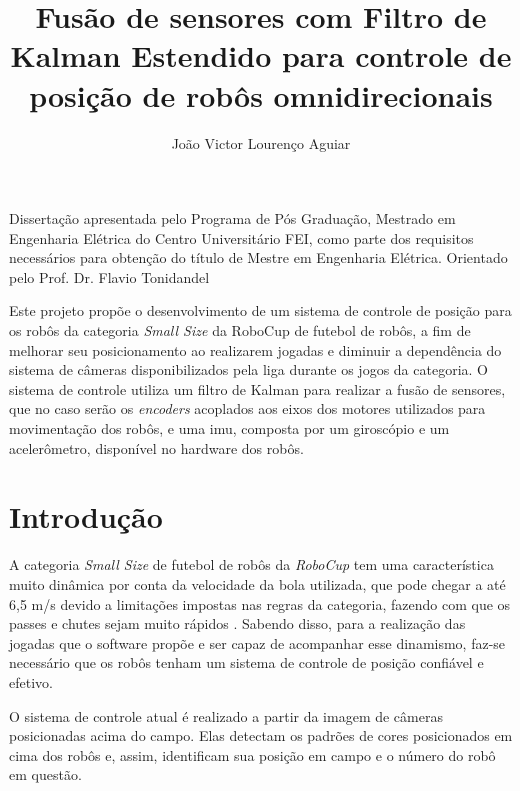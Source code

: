 \documentclass[acronym, symbols]{fei}
\title{Fusão de sensores com Filtro de Kalman Estendido para controle de posição de robôs omnidirecionais}
\author{João Victor Lourenço Aguiar}
\begin{document}
	
\maketitle

\begin{folhaderosto}
	Dissertação apresentada pelo Programa de Pós Graduação, Mestrado em Engenharia Elétrica do Centro Universitário FEI, como parte dos requisitos necessários para obtenção do título de Mestre em Engenharia Elétrica. Orientado pelo Prof. Dr. Flavio Tonidandel
\end{folhaderosto}
	
\begin{resumo}

	Este projeto propõe o desenvolvimento de um sistema de controle de posição para os robôs da categoria \textit{Small Size} da RoboCup de futebol de robôs, a fim de melhorar seu posicionamento ao realizarem jogadas e diminuir a dependência do sistema de câmeras disponibilizados pela liga durante os jogos da categoria. O sistema de controle utiliza um filtro de Kalman para realizar a fusão de sensores, que no caso serão os \textit{encoders} acoplados aos eixos dos motores utilizados para movimentação dos robôs, e uma \acrshort{imu}, composta por um giroscópio e um acelerômetro, disponível no hardware dos robôs.

\end{resumo}

\listoffigures
\listoftables
\printglossaries
\tableofcontents
\setcounter{table}{0}

\chapter{Introdução}

	A categoria \textit{Small Size} de futebol de robôs da \textit{RoboCup} tem uma característica muito dinâmica por conta da velocidade da bola utilizada, que pode chegar a até 6,5 m/s devido a limitações impostas nas regras da categoria, fazendo com que os passes e chutes sejam muito rápidos \cite{rules}. Sabendo disso, para a realização das jogadas que o software propõe e ser capaz de acompanhar esse dinamismo, faz-se necessário que os robôs tenham um sistema de controle de posição confiável e efetivo.
	
	O sistema de controle atual é realizado a partir da imagem de câmeras posicionadas acima do campo. Elas detectam os padrões de cores posicionados em cima dos robôs e, assim, identificam sua posição em campo e o número do robô em questão. %
	
\end{document}
